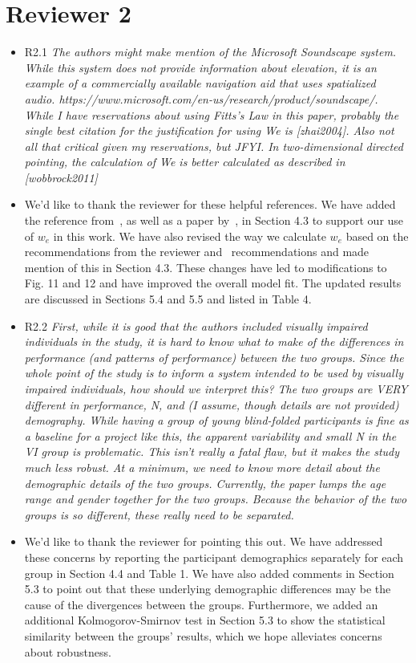 \documentclass{scrartcl}
\begin{document}
\section*{Reviewer 2}


\begin{itemize}

  \item R2.1 \textit{The authors might make mention of the Microsoft Soundscape system. While this system does not provide information about elevation, it is an example of a commercially available navigation aid that uses spatialized audio. https://www.microsoft.com/en-us/research/product/soundscape/. While I have reservations about using Fitts’s Law in this paper, probably the single best citation for the justification for using We is [zhai2004]. Also not all that critical given my reservations, but JFYI. In two-dimensional directed pointing, the calculation of We is better calculated as described in [wobbrock2011]}
  \item[] We'd like to thank the reviewer for these helpful references. 
    We have added the reference from~\cite{zhai2004speed}, as well as a paper by~\cite{kabbash1995prince}, in Section 4.3 to support our use of $w_e$ in this work.
    We have also revised the way we calculate $w_e$ based on the recommendations from the reviewer and~\cite{wobbrock2011effects} recommendations and made mention of this in Section 4.3. 
    These changes have led to modifications to Fig. 11 and 12 and have improved the overall model fit.
    The updated results are discussed in Sections 5.4 and 5.5 and listed in Table 4.
    
  \item R2.2 \textit{First, while it is good that the authors included visually impaired individuals in the study, it is hard to know what to make of the differences in performance (and patterns of performance) between the two groups. Since the whole point of the study is to inform a system intended to be used by visually impaired individuals, how should we interpret this? The two groups are VERY different in performance, N, and (I assume, though details are not provided) demography. While having a group of young blind-folded participants is fine as a baseline for a project like this, the apparent variability and small N in the VI group is problematic. This isn’t really a fatal flaw, but it makes the study much less robust. At a minimum, we need to know more detail about the demographic details of the two groups. Currently, the paper lumps the age range and gender together for the two groups. Because the behavior of the two groups is so different, these really need to be separated.}
  \item[] We'd like to thank the reviewer for pointing this out. 
    We have addressed these concerns by reporting the participant demographics separately for each group in Section 4.4 and Table 1. 
    We have also added comments in Section 5.3 to point out that these underlying demographic differences may be the cause of the divergences between the groups.  
    Furthermore, we added an additional Kolmogorov-Smirnov test in Section 5.3 to show the statistical similarity between the groups' results, which we hope alleviates concerns about robustness.


\end{itemize}
\end{document}
